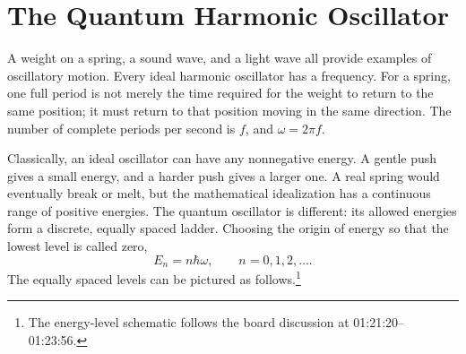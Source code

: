 \begin{classroomqa}
\end{classroomqa}

\begin{classroomqa}
\end{classroomqa}

\begin{classroomqa}
\end{classroomqa}

\section{The Quantum Harmonic Oscillator}

A weight on a spring, a sound wave, and a light wave all provide examples of oscillatory motion. Every ideal harmonic oscillator has a frequency. For a spring, one full period is not merely the time required for the weight to return to the same position; it must return to that position moving in the same direction. The number of complete periods per second is \(f\), and \(\omega=2\pi f\).

Classically, an ideal oscillator can have any nonnegative energy. A gentle push gives a small energy, and a harder push gives a larger one. A real spring would eventually break or melt, but the mathematical idealization has a continuous range of positive energies. The quantum oscillator is different: its allowed energies form a discrete, equally spaced ladder. Choosing the origin of energy so that the lowest level is called zero,
\begin{equation}
E_n=n\hbar\omega,
\qquad n=0,1,2,\ldots .
\end{equation}
The equally spaced levels can be pictured as follows.\footnote{The energy-level schematic follows the board discussion at 01:21:20--01:23:56.}

